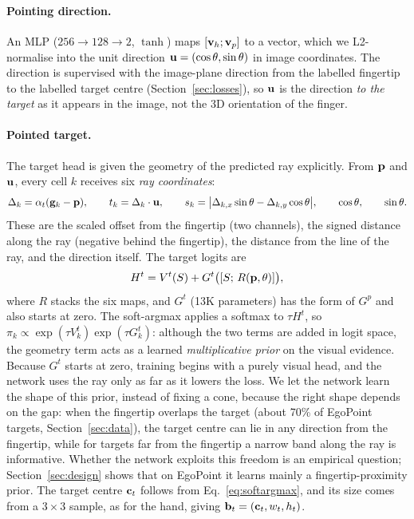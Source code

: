 \paragraph{Pointing direction.} An MLP ($256\to128\to2$, $\tanh$) maps $[\mathbf{v}_h;\mathbf{v}_p]$ to a vector, which we L2-normalise into the unit direction $\mathbf{u}=(\cos\theta,\sin\theta)$ in image coordinates. The direction is supervised with the image-plane direction from the labelled fingertip to the labelled target centre (Section~\ref{sec:losses}), so $\mathbf{u}$ is the direction \emph{to the target} as it appears in the image, not the 3D orientation of the finger.

\paragraph{Pointed target.} The target head is given the geometry of the predicted ray explicitly. From $\mathbf{p}$ and $\mathbf{u}$, every cell $k$ receives six \emph{ray coordinates}:
\begin{equation}
\Delta_k=\alpha_t(\mathbf{g}_k-\mathbf{p}),\qquad
t_k=\Delta_k\cdot\mathbf{u},\qquad
s_k=\big|\Delta_{k,x}\sin\theta-\Delta_{k,y}\cos\theta\big|,\qquad
\cos\theta,\qquad \sin\theta .
\label{eq:raycoords}
\end{equation}
These are the scaled offset from the fingertip (two channels), the signed distance along the ray (negative behind the fingertip), the distance from the line of the ray, and the direction itself. The target logits are
\begin{equation}
H^t = V^t(S) + G^t\big([S;\,R(\mathbf{p},\theta)]\big),
\label{eq:target}
\end{equation}
where $R$ stacks the six maps, and $G^t$ (13K parameters) has the form of $G^p$ and also starts at zero. The soft-argmax applies a softmax to $\tau H^t$, so $\pi_k\propto\exp(\tau V^t_k)\exp(\tau G^t_k)$: although the two terms are added in logit space, the geometry term acts as a learned \emph{multiplicative prior} on the visual evidence. Because $G^t$ starts at zero, training begins with a purely visual head, and the network uses the ray only as far as it lowers the loss. We let the network learn the shape of this prior, instead of fixing a cone, because the right shape depends on the gap: when the fingertip overlaps the target (about 70\% of EgoPoint targets, Section~\ref{sec:data}), the target centre can lie in any direction from the fingertip, while for targets far from the fingertip a narrow band along the ray is informative. Whether the network exploits this freedom is an empirical question; Section~\ref{sec:design} shows that on EgoPoint it learns mainly a fingertip-proximity prior. The target centre $\mathbf{c}_t$ follows from Eq.~\eqref{eq:softargmax}, and its size comes from a $3\times3$ sample, as for the hand, giving $\mathbf{b}_t=(\mathbf{c}_t,w_t,h_t)$.

